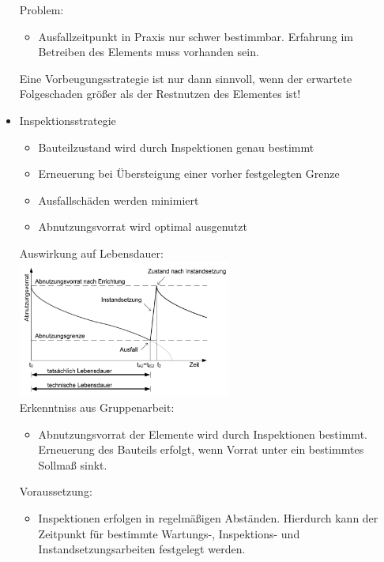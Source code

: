 \documentclass[fleqn,twoside,dvipsnames]{article}
\begin{document}
\begin{itemize}
                Problem:
                    \begin{itemize}
                        \item Ausfallzeitpunkt in Praxis nur schwer bestimmbar. Erfahrung im Betreiben des Elements muss vorhanden sein.
                    \end{itemize}
                Eine Vorbeugungsstrategie ist nur dann sinnvoll, wenn der erwartete Folgeschaden größer als der Restnutzen des Elementes ist!
            \item Inspektionsstrategie
                \begin{itemize}
                    \item Bauteilzustand wird durch Inspektionen genau bestimmt
                    \item Erneuerung bei Übersteigung einer vorher festgelegten Grenze
                    \item Ausfallschäden werden minimiert
                    \item Abnutzungsvorrat wird optimal ausgenutzt
                \end{itemize}
                Auswirkung auf Lebensdauer:\\
                \includegraphics[width=0.55\textwidth]{Grafiken/Instandhaltung/Inspektionsstrategie.png}\\
                Erkenntniss aus Gruppenarbeit:
                \begin{itemize}
                    \item Abnutzungsvorrat der Elemente wird durch Inspektionen bestimmt. Erneuerung des Bauteils erfolgt, wenn Vorrat unter ein bestimmtes Sollmaß sinkt.
                \end{itemize}
                Voraussetzung:
                    \begin{itemize}
                        \item Inspektionen erfolgen in regelmäßigen Abständen. Hierdurch kann der Zeitpunkt für bestimmte Wartungs-, Inspektions- und Instandsetzungsarbeiten festgelegt werden.

\end{itemize}
\end{itemize}
\end{document}
